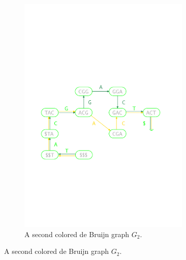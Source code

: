 \begin{figure}[h!]
\begin{subfigure}[c]{0.4\textwidth}
        \includegraphics[width=0.9\textwidth]{limegraph.pdf}
        \caption{A second colored de Bruijn graph $G_2$.}
        \label{fig:g2}
    \end{subfigure}
   

\end{figure}
